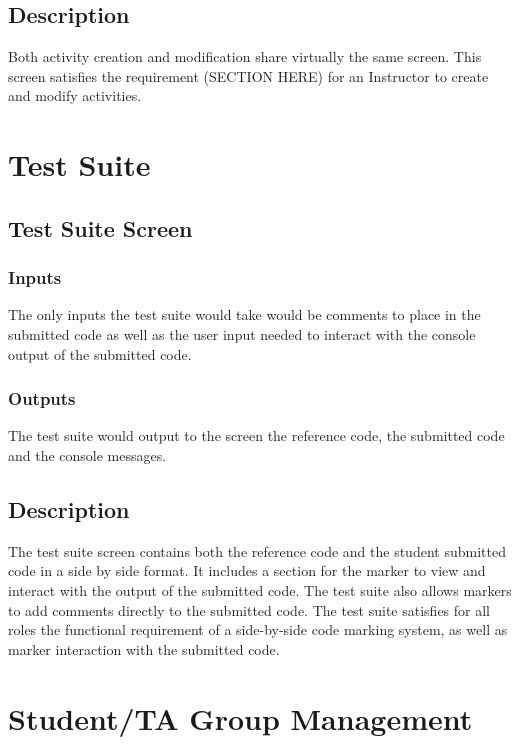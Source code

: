 \documentclass{article}
\begin{document}
\subsection{Description}
Both activity creation and modification share virtually the same screen.
This screen satisfies the requirement (SECTION HERE) for an Instructor to create and modify activities.

\section{Test Suite}
\subsection{Test Suite Screen}
\subsubsection{Inputs}
The only inputs the test suite would take would be comments to place in the submitted code as well as the user input needed to interact with the console output of the submitted code.
\subsubsection{Outputs}
The test suite would output to the screen the reference code, the submitted code and the console messages.
\subsection{Description}
The test suite screen contains both the reference code and the student submitted code in a side by side format.  It includes a section for the marker to view and interact with the output of the submitted code.  The test suite also allows markers to add comments directly to the submitted code.  The test suite satisfies for all roles the functional requirement of a side-by-side code marking system, as well as marker interaction with the submitted code.

\section{Student/TA Group Management}
\end{document}
